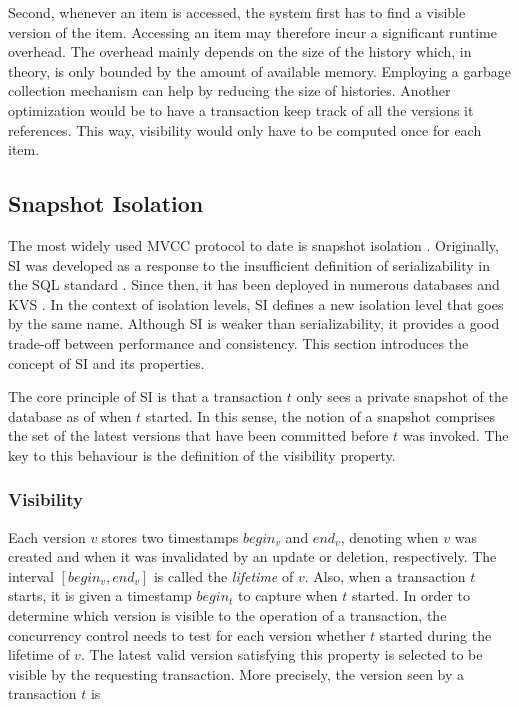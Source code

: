 Second, whenever an item is accessed, the system first has to find a visible
version of the item. Accessing an item may therefore incur a significant runtime
overhead. The overhead mainly depends on the size of the history which, in
theory, is only bounded by the amount of available memory. Employing a garbage
collection mechanism can help by reducing the size of histories. Another
optimization would be to have a transaction keep track of all the versions it
references. This way, visibility would only have to be computed once for each
item.

\subsection{Snapshot Isolation}

The most widely used MVCC protocol to date is snapshot isolation
\cite{larson2011high, neumann2015fast}. Originally, SI was developed as a
response to the insufficient definition of serializability in the SQL standard
\cite{berenson1995critique}. Since then, it has been deployed in numerous
databases and KVS \cite{cahill2009serializable, wu2017empirical}. In the context
of isolation levels, SI defines a new isolation level that goes by the same
name. Although SI is weaker than serializability, it provides a good trade-off
between performance and consistency. This section introduces the concept of SI
and its properties.

The core principle of SI is that a transaction $t$ only sees a private snapshot
of the database as of when $t$ started. In this sense, the notion of a snapshot
comprises the set of the latest versions that have been committed before $t$ was
invoked. The key to this behaviour is the definition of the visibility property.

\subsubsection{Visibility}

Each version $v$ stores two timestamps $begin_v$ and $end_v$, denoting when $v$
was created and when it was invalidated by an update or deletion, respectively.
The interval $[begin_v,  end_v]$ is called the \emph{lifetime} of $v$. Also,
when a transaction $t$ starts, it is given a timestamp $begin_t$ to capture when
$t$ started. In order to determine which version is visible to the operation of
a transaction, the concurrency control needs to test for each version whether
$t$ started during the lifetime of $v$. The latest valid version satisfying this
property is selected to be visible by the requesting transaction. More
precisely, the version seen by a transaction $t$ is

